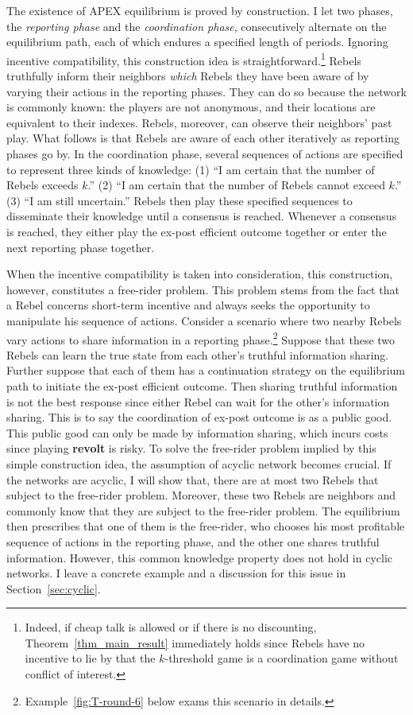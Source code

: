 \documentclass[12pt,letter]{article}
\theoremstyle{definition}
\theoremstyle{definition}
\theoremstyle{remark}
\theoremstyle{claim}
\begin{document}
The existence of APEX equilibrium is proved by construction. I let two phases, the \textit{reporting phase} and the \textit{coordination phase}, consecutively alternate on the equilibrium path, each of which endures a specified length of periods. Ignoring incentive compatibility, this construction idea is straightforward.\footnote{Indeed, if cheap talk is allowed or if there is no discounting, Theorem~\ref{thm_main_result} immediately holds since Rebels have no incentive to lie by that the $k$-threshold game is a coordination game without conflict of interest.} 
Rebels truthfully inform their neighbors \textit{which} Rebels they have been aware of by varying their actions in the reporting phases. They can do so because the network is commonly known: the players are not anonymous, and their locations are equivalent to their indexes. Rebels, moreover, can observe their neighbors' past play. What follows is that Rebels are aware of each other iteratively as reporting phases go by. In the coordination phase, several sequences of actions are specified to represent three kinds of knowledge: (1) ``I am certain that the number of Rebels exceeds $k$.'' (2) ``I am certain that the number of Rebels cannot exceed $k$.'' (3) ``I am still uncertain.'' Rebels then play these specified sequences to disseminate their knowledge until a consensus is reached. Whenever a consensus is reached, they either play the ex-post efficient outcome together or enter the next reporting phase together.


When the incentive compatibility is taken into consideration, this construction, however, constitutes a free-rider problem. This problem stems from the fact that a Rebel concerns short-term incentive and always seeks the opportunity to manipulate his sequence of actions. Consider a scenario where two nearby Rebels vary actions to share information in a reporting phase.\footnote{Example~\ref{fig:T-round-6} below exams this scenario in details.}
Suppose that these two Rebels can learn the true state from each other's truthful information sharing. Further suppose that each of them has a continuation strategy on the equilibrium path to initiate the ex-post efficient outcome. Then sharing truthful information is not the best response since either Rebel can wait for the other's information sharing. This is to say the coordination of ex-post outcome is as a public good. This public good can only be made by information sharing, which incurs costs since playing \textbf{revolt} is risky. To solve the free-rider problem implied by this simple construction idea, the assumption of acyclic network becomes crucial. If the networks are acyclic, I will show that, there are at most two Rebels that subject to the free-rider problem. Moreover, these two Rebels are neighbors and commonly know that they are subject to the free-rider problem. The equilibrium then prescribes that one of them is the free-rider, who chooses his most profitable sequence of actions in the reporting phase, and the other one shares truthful information. However, this common knowledge property does not hold in cyclic networks. I leave a concrete example and a discussion for this issue in Section~\ref{sec:cyclic}.
\end{document}
